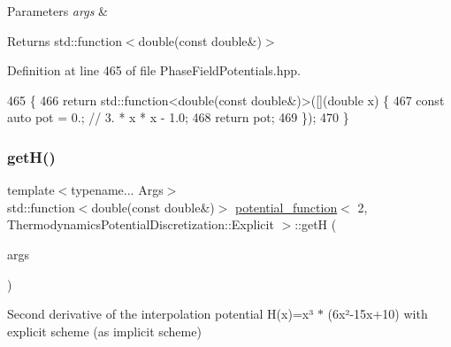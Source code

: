 \begin{DoxyParams}{Parameters}
{\em args} & \\
\hline
\end{DoxyParams}
\begin{DoxyReturn}{Returns}
std\+::function$<$double(const double\&)$>$ 
\end{DoxyReturn}


Definition at line 465 of file Phase\+Field\+Potentials.\+hpp.


\begin{DoxyCode}
465                                                         \{
466     \textcolor{keywordflow}{return} std::function<double(const double&)>([](\textcolor{keywordtype}{double} x) \{
467       \textcolor{keyword}{const} \textcolor{keyword}{auto} pot = 0.;  \textcolor{comment}{// 3. * x * x - 1.0;}
468       \textcolor{keywordflow}{return} pot;
469     \});
470   \}
\end{DoxyCode}
\mbox{\label{structpotential__function_3_012_00_01ThermodynamicsPotentialDiscretization_1_1Explicit_01_4_ad4a73c3a179befc41ece2e5a96d71b1e}} 
\subsubsection{\texorpdfstring{get\+H()}{getH()}}
{\footnotesize\ttfamily template$<$typename... Args$>$ \\
std\+::function$<$double(const double\&)$>$ \hyperlink{structpotential__function}{potential\+\_\+function}$<$ 2, Thermodynamics\+Potential\+Discretization\+::\+Explicit $>$\+::getH (\begin{DoxyParamCaption}\item[{Args...}]{args }\end{DoxyParamCaption})\hspace{0.3cm}{\ttfamily [inline]}}



Second derivative of the interpolation potential H(x)=x³ $\ast$ (6x²-\/15x+10) with explicit scheme (as implicit scheme) 


